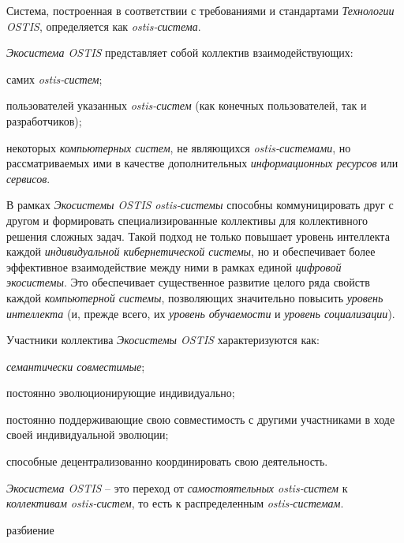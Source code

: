 Система, построенная в соответствии с требованиями и стандартами \textit{Технологии OSTIS}, определяется как \textit{ostis-система}. 

\textit{Экосистема OSTIS} представляет собой коллектив взаимодействующих:
\begin{textitemize}
    \item самих \textit{ostis-систем};
    \item пользователей указанных \textit{ostis-систем} (как конечных пользователей, так и разработчиков);
    \item некоторых \textit{компьютерных систем}, не являющихся \textit{ostis-системами}, но рассматриваемых ими в качестве дополнительных \textit{информационных ресурсов} или \textit{сервисов}.
\end{textitemize}

В рамках \textit{Экосистемы OSTIS} \textit{ostis-системы} способны коммуницировать друг с другом и формировать специализированные коллективы для коллективного решения сложных задач. Такой подход не только повышает уровень интеллекта каждой \textit{индивидуальной кибернетической системы}, но и обеспечивает более эффективное взаимодействие между ними в рамках единой \textit{цифровой экосистемы}. Это обеспечивает существенное развитие целого ряда свойств каждой \textit{компьютерной системы}, позволяющих значительно повысить \textit{уровень интеллекта} (и, прежде всего, их \textit{уровень обучаемости} и \textit{уровень социализации}). 

Участники коллектива \textit{Экосистемы OSTIS} характеризуются как:
\begin{textitemize}
    \item \textit{семантически совместимые};
    \item постоянно эволюционирующие индивидуально;
    \item постоянно поддерживающие свою совместимость с другими участниками в ходе своей индивидуальной эволюции;
    \item способные децентрализованно координировать свою деятельность.
\end{textitemize}

\textit{Экосистема OSTIS} – это переход от \textit{самостоятельных ostis-систем} к \textit{коллективам ostis-систем}, то есть к распределенным \textit{ostis-системам}.

\begin{SCn}
\begin{scnrelfromset}{разбиение}
\end{scnrelfromset}
\end{SCn}


